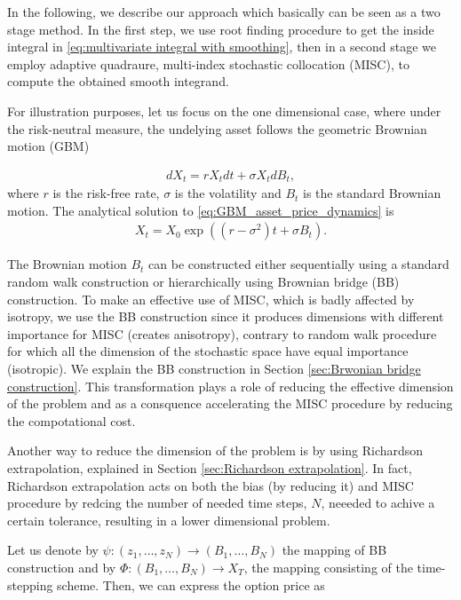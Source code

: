 \documentclass[11pt]{article}
\newcommand{\PERIOD}{.}
\newcommand{\COMMA}{,}
\begin{document}
 In the following, we describe our approach which basically can be seen as a two stage method. In the first step, we use root finding procedure to get the inside integral  in \ref{eq:multivariate integral with smoothing}, then in a second stage we employ adaptive quadraure, multi-index stochastic collocation (MISC), to compute the obtained smooth integrand.


For illustration purposes, let us focus on the one dimensional case, where under the risk-neutral measure, the undelying asset follows the geometric Brownian motion (GBM)

\begin{align}\label{eq:GBM_asset_price_dynamics}
dX_t= r X_t dt+\sigma X_t dB_t \COMMA 
\end{align}
		where $r$ is the risk-free rate, $\sigma$ is the volatility and $B_t$ is the standard Brownian motion. The analytical solution to  \eqref{eq:GBM_asset_price_dynamics} is 
\begin{align}\label{eq:GBM_asset_price_analytic_sol}
	X_t=  X_0 \exp(( r-\sigma^2) t+\sigma B_t) \PERIOD
\end{align}

The Brownian motion $B_t$ can be constructed either sequentially using a standard random walk construction or hierarchically using Brownian bridge (BB) construction. To make an effective use of MISC, which is badly affected by isotropy, we use the BB construction since it produces  dimensions with different importance for MISC (creates anisotropy), contrary to random walk procedure for which all the dimension of the stochastic space have equal importance (isotropic). We explain the BB construction in Section \ref{sec:Brwonian bridge construction}. This transformation plays a role of reducing the effective dimension of the problem and as a consquence accelerating the MISC procedure by reducing the compotational cost.



Another way to reduce the dimension of the problem is by using Richardson extrapolation, explained in Section \ref{sec:Richardson extrapolation}. In fact, Richardson extrapolation acts on both the bias (by reducing it) and MISC procedure by redcing the number of needed time steps, $N$, neeeded to achive a certain tolerance, resulting in a lower dimensional problem.





Let us denote by $\psi: (z_1,\dots,z_N) \rightarrow (B_1,\dots,B_N)$ the mapping of BB construction and by $\Phi: (B_1,\dots,B_N) \rightarrow X_T$, the mapping consisting of the time-stepping scheme. Then, we can express the option price as
\end{document}

